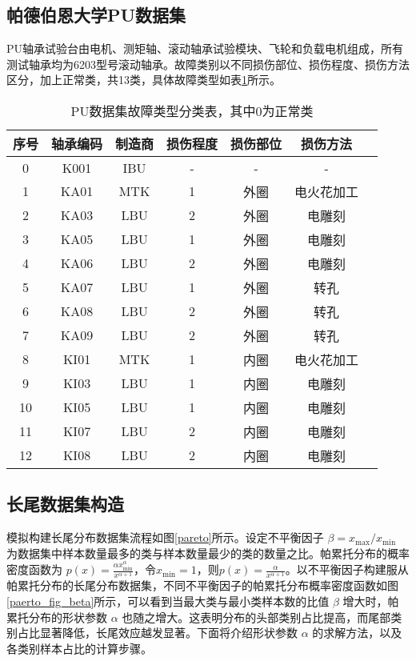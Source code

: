 \documentclass[master]{thesis-uestc}
\begin{document}
\subsection{帕德伯恩大学PU数据集}
PU轴承试验台由电机、测矩轴、滚动轴承试验模块、飞轮和负载电机组成，所有测试轴承均为6203型号滚动轴承。故障类别以不同损伤部位、损伤程度、损伤方法区分，加上正常类，共13类，具体故障类型如表\ref{tab:pu_fault_types}所示。
\begin{table}[H]
    \centering
    \caption{PU数据集故障类型分类表，其中0为正常类}
    \renewcommand\arraystretch{1.2}
    \begin{tabular}{ccccccc}
        \toprule
        序号 & 轴承编码 & 制造商 & 损伤程度 & 损伤部位 & 损伤方法 \\
        \midrule
        0  & K001 & IBU & - & - & - \\
        1  & KA01 & MTK & 1 & 外圈 & 电火花加工 \\
        2  & KA03 & LBU & 2 & 外圈 & 电雕刻 \\
        3  & KA05 & LBU & 1 & 外圈 & 电雕刻 \\
        4  & KA06 & LBU & 2 & 外圈 & 电雕刻 \\
        5  & KA07 & LBU & 1 & 外圈 & 转孔 \\
        6  & KA08 & LBU & 2 & 外圈 & 转孔 \\
        7  & KA09 & LBU & 2 & 外圈 & 转孔 \\
        8  & KI01 & MTK & 1 & 内圈 & 电火花加工 \\
        9  & KI03 & LBU & 1 & 内圈 & 电雕刻 \\
        10 & KI05 & LBU & 1 & 内圈 & 电雕刻 \\
        11 & KI07 & LBU & 2 & 内圈 & 电雕刻 \\
        12 & KI08 & LBU & 2 & 内圈 & 电雕刻 \\
        \bottomrule
    \end{tabular}
    \label{tab:pu_fault_types}
\end{table}


\FloatBarrier  %
\subsection{长尾数据集构造}
模拟构建长尾分布数据集流程如图\ref{pareto}所示。设定不平衡因子 \(\beta = x_{\text{max}} / x_{\text{min}}\) 为数据集中样本数量最多的类与样本数量最少的类的数量之比。帕累托分布的概率密度函数为 \(p(x) = \frac{\alpha x_{\text{min}}^{\alpha}}{x^{\alpha+1}}\)，令$x_{\text{min}} = 1$，则\(p(x) = \frac{\alpha}{x^{\alpha+1}}\)。以不平衡因子构建服从帕累托分布的长尾分布数据集，不同不平衡因子的帕累托分布概率密度函数如图\ref{paerto_fig_beta}所示，可以看到当最大类与最小类样本数的比值 \(\beta\) 增大时，帕累托分布的形状参数 \(\alpha\) 也随之增大。这表明分布的头部类别占比提高，而尾部类别占比显著降低，长尾效应越发显著。下面将介绍形状参数 \(\alpha\) 的求解方法，以及各类别样本占比的计算步骤。
\end{document}
